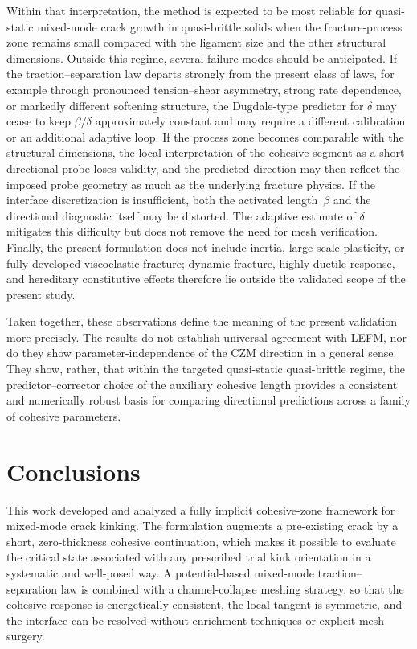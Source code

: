\documentclass[smallextended]{svjour3}       %
\begin{document}
Within that interpretation, the method is expected to be most reliable for
quasi-static mixed-mode crack growth in quasi-brittle solids when the
fracture-process zone remains small compared with the ligament size and the
other structural dimensions. Outside this regime, several failure modes should
be anticipated. If the traction--separation law departs strongly from the
present class of laws, for example through pronounced tension--shear
asymmetry, strong rate dependence, or markedly different softening structure,
the Dugdale-type predictor for $\delta$ may cease to keep $\beta/\delta$
approximately constant and may require a different calibration or an
additional adaptive loop. If the process zone becomes comparable with the
structural dimensions, the local interpretation of the cohesive segment as a
short directional probe loses validity, and the predicted direction may then
reflect the imposed probe geometry as much as the underlying fracture
physics. If the interface discretization is insufficient, both the activated
length~$\beta$ and the directional diagnostic itself may be distorted. The
adaptive estimate of $\delta$ mitigates this difficulty but does not remove
the need for mesh verification. Finally, the present formulation does not
include inertia, large-scale plasticity, or fully developed viscoelastic
fracture; dynamic fracture, highly ductile response, and hereditary
constitutive effects therefore lie outside the validated scope of the present
study.

Taken together, these observations define the meaning of the present
validation more precisely. The results do not establish universal agreement
with LEFM, nor do they show parameter-independence of the CZM direction in a
general sense. They show, rather, that within the targeted quasi-static
quasi-brittle regime, the predictor--corrector choice of the auxiliary
cohesive length provides a consistent and numerically robust basis for
comparing directional predictions across a family of cohesive parameters.

\section{Conclusions}
\label{sec:conclusions}

This work developed and analyzed a fully implicit cohesive-zone framework
for mixed-mode crack kinking. The formulation augments a pre-existing crack
by a short, zero-thickness cohesive continuation, which makes it possible to
evaluate the critical state associated with any prescribed trial kink
orientation in a systematic and well-posed way. A potential-based mixed-mode
traction--separation law is combined with a channel-collapse meshing
strategy, so that the cohesive response is energetically consistent, the
local tangent is symmetric, and the interface can be resolved without
enrichment techniques or explicit mesh surgery.
\end{document}
